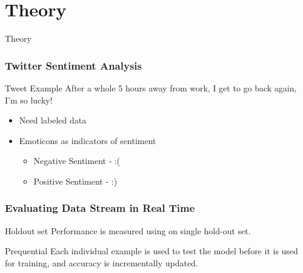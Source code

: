 \section{Theory}

\begin{frame}
        \centering
        \huge Theory
\end{frame}

\begin{frame}
	\frametitle{Twitter Sentiment Analysis}
	\begin{block}{Tweet Example}
		After a whole 5 hours away from work, I get to go back again, I’m so lucky!
	\end{block}
	\begin{itemize}
		\item Need labeled data
		\item Emoticons as indicators of sentiment
		\begin{itemize}
			\item Negative Sentiment - :(
			\item Positive Sentiment - :)
		\end{itemize}
	\end{itemize}
\end{frame}

\begin{frame}
	\frametitle{Evaluating Data Stream in Real Time}
	\begin{block}{Holdout set}
		Performance is measured using on single hold-out set.
	\end{block}
	\begin{block}{Prequential}
		 Each individual example
		 is used to test the model before it is used for training, and accuracy is
		 incrementally updated.
	\end{block}
\end{frame}


